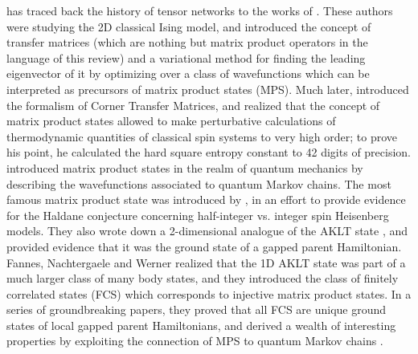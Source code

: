 \documentclass[rmp,aps,reprint,superscriptaddress,nobalancelastpage]{revtex4-1}
\begin{document}
\citet{nishino:history} has traced back the history of tensor networks to the works of \citet{kramers1941statistics}.  These authors were studying the 2D classical Ising model, and introduced the concept of transfer matrices (which are nothing but matrix product operators in the language of this review)  and a variational method for finding the leading eigenvector of it by optimizing over a class of wavefunctions which can be interpreted as precursors of matrix product states (MPS). Much later, \citet{baxter1968dimers,baxter1981corner,baxter:book} introduced the formalism of Corner Transfer Matrices, and realized that the concept of matrix product states allowed to make perturbative calculations of thermodynamic quantities of classical spin systems to very high order; to prove his point, he calculated the hard square entropy constant to 42 digits of precision. \citet{accardi1981topics} introduced matrix product states in the realm of quantum mechanics by describing the wavefunctions associated to quantum Markov chains. The most famous matrix product state was introduced by \citet*[][the \emph{AKLT state}]{affleck:aklt-prl}, in an effort to provide evidence for the Haldane conjecture concerning half-integer  vs. integer spin Heisenberg models. They also wrote down a 2-dimensional analogue of the AKLT state \cite{affleck:aklt-cmp}, and provided evidence that it was the ground state of a gapped parent Hamiltonian. Fannes, Nachtergaele and Werner realized that the 1D AKLT state was part of a much larger class of many body states, and they introduced the class of finitely correlated states (FCS)  which corresponds to injective matrix product states. In a series of groundbreaking papers, they proved that all FCS are unique ground states of local gapped parent Hamiltonians, and derived a wealth of interesting properties by exploiting the connection of MPS to quantum Markov chains \cite{fannes:FCS,fannes1989exact,fannes1994finitely,fannes1991valence,fannes1992abundance,fannes1996quantum}.
\end{document}
